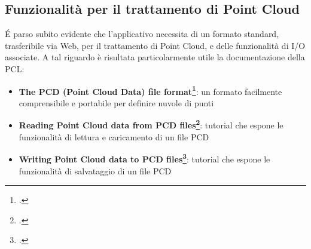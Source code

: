 \subsection{Funzionalità per il trattamento di Point Cloud}
\'E parso subito evidente che l'applicativo necessita di un formato standard, trasferibile via Web, per il trattamento di Point Cloud, e delle funzionalità di I/O associate. A tal riguardo è risultata particolarmente utile la documentazione della PCL:
\begin{itemize}
\item\textbf{The PCD (Point Cloud Data) file format\footcite{http://pointclouds.org/documentation/tutorials/pcd_file_format.php/pcd-file-format}}:
un formato facilmente comprensibile e portabile per definire nuvole di punti
\item\textbf{Reading Point Cloud data from PCD files\footcite{http://pointclouds.org/documentation/tutorials/reading_pcd.php/reading-pcd}}:
tutorial che espone le funzionalità di lettura e caricamento di un file PCD
\item\textbf{Writing Point Cloud data to PCD files\footcite{http://pointclouds.org/documentation/tutorials/writing_pcd.php/writing-pcd}}:
tutorial che espone le funzionalità di salvataggio di un file PCD
\end{itemize}

